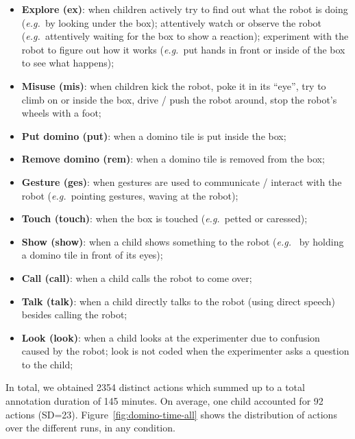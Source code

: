 \documentclass{sig-alternate}
\newcommand{\eg}{{\textit{e.g.~}}}
\begin{document}
\begin{itemize}

    \item \textbf{Explore (ex)}: when children actively try to find out what the
        robot is doing (\eg by looking under the box); attentively watch or
        observe the robot (\eg attentively waiting for the box to show a
        reaction); experiment with the robot to figure out how it works (\eg put
        hands in front or inside of the box to see what happens);

    \item \textbf{Misuse (mis)}: when children kick the robot, poke it in its
        ``eye'', try to climb on or inside the box, drive / push the robot
        around, stop the robot's wheels with a foot;

    \item \textbf{Put domino (put)}: when a domino tile is put inside the box;

    \item \textbf{Remove domino (rem)}: when a domino tile is removed from the
        box;

    \item \textbf{Gesture (ges)}: when gestures are used to communicate /
        interact with the robot (\eg pointing gestures, waving at the robot);

    \item \textbf{Touch (touch)}: when the box is touched (\eg petted or
        caressed);

    \item \textbf{Show (show)}: when a child shows something to the robot (\eg
        by holding a domino tile in front of its eyes);

    \item \textbf{Call (call)}: when a child calls the robot to come over;

    \item \textbf{Talk (talk)}: when a child directly talks to the robot (using
        direct speech) besides calling the robot;

    \item \textbf{Look (look)}:	when a child looks at the experimenter due to
        confusion caused by the robot; look is not coded when the experimenter
        asks a question to the child;

\end{itemize}

In total, we obtained 2354 distinct actions which summed up to a total
annotation duration of 145 minutes. On average, one child accounted for 92
actions (SD=23). Figure~\ref{fig:domino-time-all} shows the distribution of
actions over the different runs, in any condition.
\end{document}
